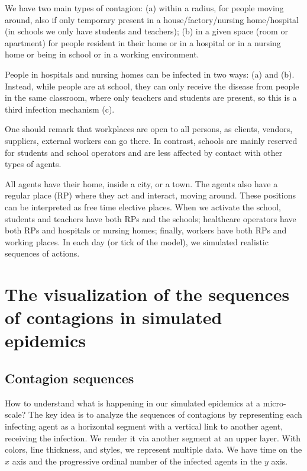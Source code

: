 \documentclass[11pt]{article}
\begin{document}
We have two main types of contagion: (a) within a radius, for people moving around, also if only temporary present in a house/factory/nursing home/hospital (in schools we only have students and teachers); (b) in a given space (room or apartment) for people resident in their home or in a hospital or in a nursing home or being in school or in a working environment.

People in hospitals and nursing homes can be infected in two ways: (a) and (b). Instead, while people are at school, they can only receive the disease from people in the same classroom, where only teachers and students are present, so this is a third infection mechanism (c).

One should remark that workplaces are open to all persons, as clients, vendors, suppliers, external workers can go there. In contrast, schools are mainly reserved for students and school operators and are less affected by contact with other types of agents.

All agents have their home, inside a city, or a town. The agents also have a regular place (RP) where they act and interact, moving around. These positions can be interpreted as free time elective places. When we activate the school, students and teachers have both RPs and the schools; healthcare operators have both RPs and hospitals or nursing homes; finally, workers have both RPs and working places. In each day (or tick of the model), we simulated realistic sequences of actions.



\section{The visualization of the sequences of contagions in simulated epidemics}


\subsection{Contagion sequences}

How to understand what is happening in our simulated epidemics at a micro-scale? The key idea is to analyze the sequences of contagions by representing each infecting agent as a horizontal segment with a vertical link to another agent, receiving the infection. We render it via another segment at an upper layer. With colors, line thickness, and styles, we represent multiple data. We have time on the $x$ axis and the progressive ordinal number of the infected agents in the $y$ axis.
\end{document}
